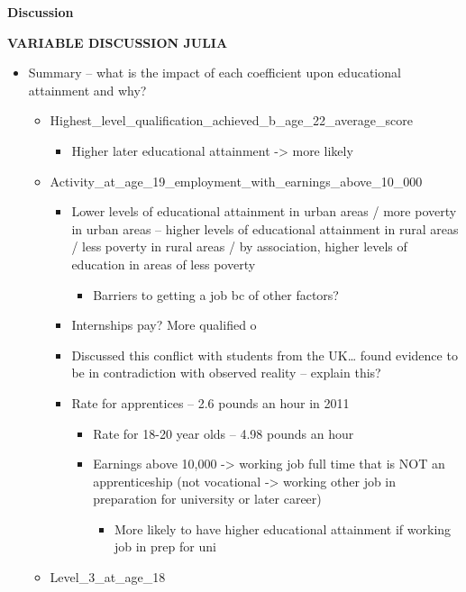 \documentclass[
  letterpaper,
  DIV=11,
  numbers=noendperiod]{scrartcl}
\providecommand{\tightlist}{%
  \setlength{\itemsep}{0pt}\setlength{\parskip}{0pt}}\usepackage{longtable,booktabs,array}
\begin{document}
\textbf{Discussion}

\textbf{VARIABLE DISCUSSION JULIA}

\begin{itemize}
\item
  Summary -- what is the impact of each coefficient upon educational
  attainment and why?~

  \begin{itemize}
  \item
    Highest\_level\_qualification\_achieved\_b\_age\_22\_average\_score

    \begin{itemize}
    \tightlist
    \item
      Higher later educational attainment -\textgreater{} more likely~
    \end{itemize}
  \item
    Activity\_at\_age\_19\_employment\_with\_earnings\_above\_10\_000

    \begin{itemize}
    \item
      Lower levels of educational attainment in urban areas / more
      poverty in urban areas -- higher levels of educational attainment
      in rural areas / less poverty in rural areas / by association,
      higher levels of education in areas of less poverty

      \begin{itemize}
      \tightlist
      \item
        Barriers to getting a job bc of other factors?
      \end{itemize}
    \item
      Internships pay? More qualified o
    \item
      Discussed this conflict with students from the UK\ldots{} found
      evidence to be in contradiction with observed reality -- explain
      this?~
    \item
      Rate for apprentices -- 2.6 pounds an hour in 2011

      \begin{itemize}
      \item
        Rate for 18-20 year olds -- 4.98 pounds an hour~
      \item
        Earnings above 10,000 -\textgreater{} working job full time that
        is NOT an apprenticeship (not vocational -\textgreater{} working
        other job in preparation for university or later career)~

        \begin{itemize}
        \tightlist
        \item
          More likely to have higher educational attainment if working
          job in prep for uni
        \end{itemize}
      \end{itemize}
    \end{itemize}
  \item
    Level\_3\_at\_age\_18


\end{itemize}
\end{itemize}
\end{document}
